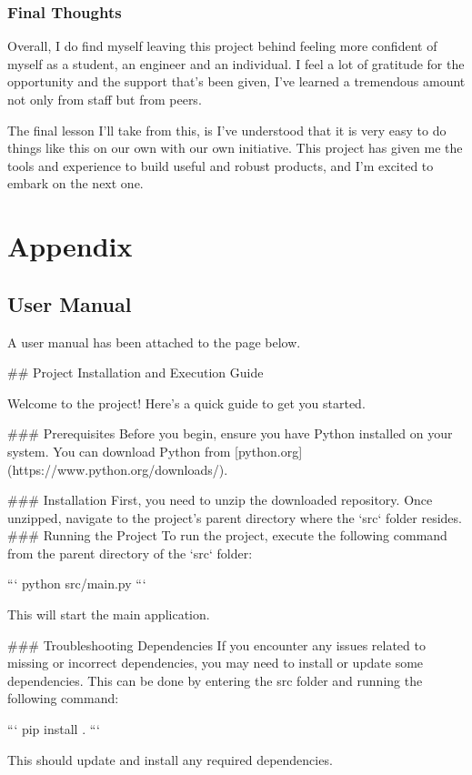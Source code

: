 \documentclass[letterpaper,10pt]{article}
\begin{document}
\subsubsection{Final Thoughts}
Overall, I do find myself leaving this project behind feeling more confident of myself as a student, an engineer and an individual. I feel a lot of gratitude for the opportunity and the support that's been given, I've learned a tremendous amount not only from staff but from peers. \par

The final lesson I'll take from this, is I've understood that it is very easy to do things like this on our own with our own initiative. This project has given me the tools and experience to build useful and robust products, and I'm excited to embark on the next one.
\newpage




\appendix

\section{Appendix}
\subsection{User Manual}
A user manual has been attached to the page below.
\begin{markdown}
## Project Installation and Execution Guide

Welcome to the project! Here's a quick guide to get you started.

### Prerequisites
Before you begin, ensure you have Python installed on your system. You can download Python from [python.org](https://www.python.org/downloads/).

### Installation
First, you need to unzip the downloaded repository. Once unzipped, navigate to the project's parent directory where the `src` folder resides.
### Running the Project
To run the project, execute the following command from the parent directory of the `src` folder:
    

```
python src/main.py
```

   
This will start the main application.

### Troubleshooting Dependencies
If you encounter any issues related to missing or incorrect dependencies, you may need to install or update some dependencies. This can be done by entering the src folder and running the following command:

    
```
pip install .
```

   
This should update and install any required dependencies.



\end{markdown}

\end{document}
